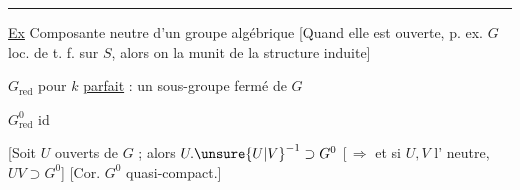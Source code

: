 \par\noindent\rule{.94\linewidth}{.4pt}\par
\uline{Ex} Composante neutre  d'un groupe algébrique \deleted{[elle est quasi-compacte} [Quand elle est ouverte, p. ex. $G$ loc. de t. f. sur $S$, alors on la munit de la structure induite]

$G_{\mathrm{red}}$ pour $k$ \uline{parfait} : un sous-groupe fermé de $G$

$G^{0}_{\mathrm{red}}$ id

[Soit $U$   ouverts de $G$ ; alors $U.\unsure{U|V}^{-1}\supset G^0$ [\,$\Rightarrow$ et si $U,V$  l' neutre, $UV\supset G^0$] [Cor. $G^0$ quasi-compact.]


